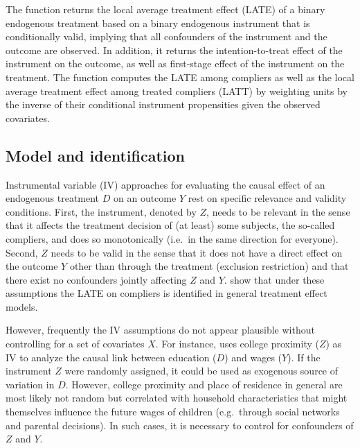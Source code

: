 \documentclass[nojss]{jss}
\begin{document}
The function  returns the local average treatment effect (LATE) of a binary endogenous treatment based on a binary endogenous instrument that is conditionally valid, implying that all confounders of the instrument and the outcome are observed. In addition, it returns the intention-to-treat effect of the instrument on the outcome, as well as first-stage effect of the instrument on the treatment. The function  computes the LATE among compliers as well as the local average treatment effect among treated compliers (LATT) by weighting units by the inverse of their conditional instrument propensities given the observed covariates. %

\subsection{Model and identification}\label{latemodident}

Instrumental variable (IV) approaches for evaluating the causal effect of an endogenous treatment $D$ on an outcome $Y$ rest on specific relevance and validity conditions. First, the instrument, denoted by $Z$, needs to be relevant in the sense that it affects the treatment decision of (at least) some subjects, the so-called compliers, and does so monotonically (i.e.\ in the same direction for everyone). Second, $Z$ needs to be valid in the sense that it does not have a direct effect on the outcome $Y$ other than through the treatment (exclusion restriction) and that there exist no confounders jointly affecting $Z$ and $Y$. \citet{ImAn94} show that under these assumptions the LATE on compliers is identified in general treatment effect models.

However, frequently the IV assumptions do not appear plausible without controlling for a set of covariates $X$. For instance, \citet{Card95} uses college proximity ($Z$) as IV to analyze the causal link between education ($D$) and wages ($Y$). If the instrument $Z$ were randomly assigned, it could be used as exogenous source of variation in $D$. However, college proximity and place of residence in general are most likely not random but correlated with household characteristics that might themselves influence the future wages of children  (e.g.\ through social networks and parental decisions). In such cases, it is necessary to control for confounders of $Z$ and $Y$.
\end{document}
